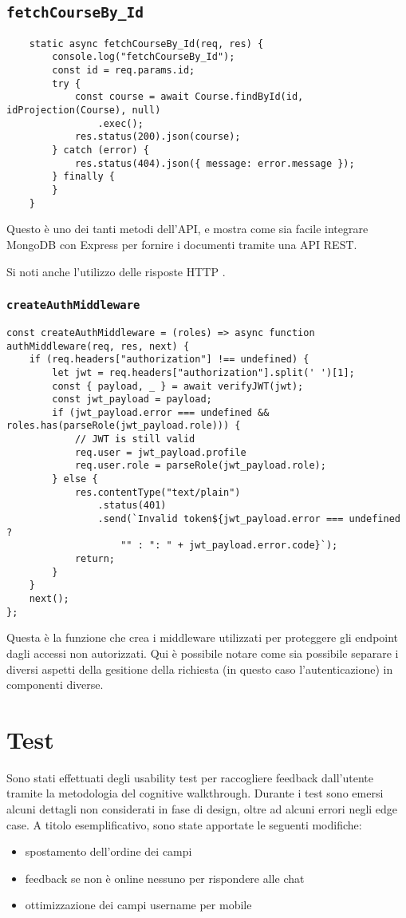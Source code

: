 \documentclass{report}
\begin{document}
\subsection{\texttt{fetchCourseBy\_Id}}
\begin{verbatim}
    static async fetchCourseBy_Id(req, res) {
        console.log("fetchCourseBy_Id");
        const id = req.params.id;
        try {
            const course = await Course.findById(id, idProjection(Course), null)
                .exec();
            res.status(200).json(course);
        } catch (error) {
            res.status(404).json({ message: error.message });
        } finally {
        }
    }
\end{verbatim}
\par Questo è uno dei tanti metodi dell'API, e mostra come sia facile integrare MongoDB con Express per fornire i documenti tramite una API REST.
\par Si noti anche l'utilizzo delle risposte HTTP \citep{rfc2616}.
\subsubsection{\texttt{createAuthMiddleware}}
\begin{verbatim}
const createAuthMiddleware = (roles) => async function authMiddleware(req, res, next) {
    if (req.headers["authorization"] !== undefined) {
        let jwt = req.headers["authorization"].split(' ')[1];
        const { payload, _ } = await verifyJWT(jwt);
        const jwt_payload = payload;
        if (jwt_payload.error === undefined && roles.has(parseRole(jwt_payload.role))) {
            // JWT is still valid
            req.user = jwt_payload.profile
            req.user.role = parseRole(jwt_payload.role);
        } else {
            res.contentType("text/plain")
                .status(401)
                .send(`Invalid token${jwt_payload.error === undefined ?
                    "" : ": " + jwt_payload.error.code}`);
            return;
        }
    }
    next();
};
\end{verbatim}
\par Questa è la funzione che crea i middleware utilizzati per proteggere gli endpoint dagli accessi non autorizzati. Qui è possibile notare come sia possibile separare i diversi aspetti della gesitione della richiesta (in questo caso l'autenticazione) in componenti diverse.
\section{Test}
\par Sono stati effettuati degli usability test per raccogliere feedback dall'utente tramite la metodologia del cognitive walkthrough. Durante i test sono emersi alcuni dettagli non considerati in fase di design, oltre ad alcuni errori negli edge case. A titolo esemplificativo, sono state apportate le seguenti modifiche:
\begin{itemize}
    \item spostamento dell'ordine dei campi
    \item feedback se non è online nessuno per rispondere alle chat
    \item ottimizzazione dei campi username per mobile
\end{itemize}
\end{document}
